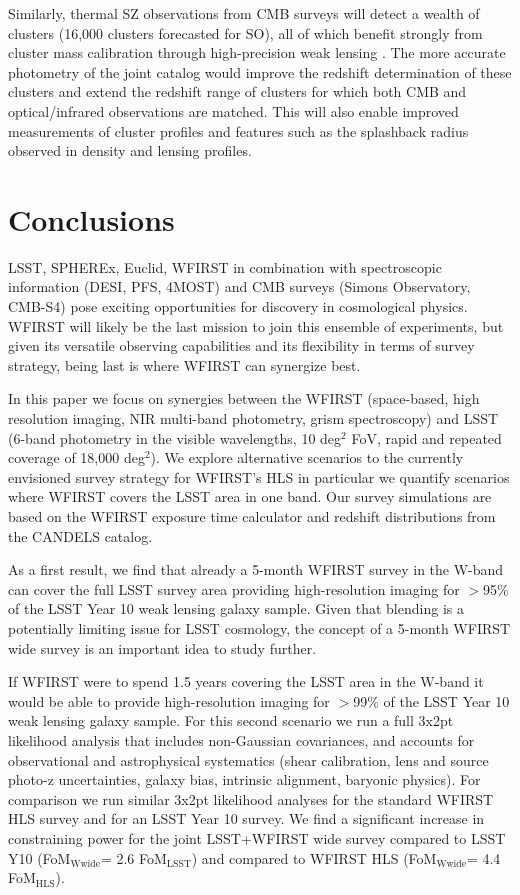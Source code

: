 \documentclass[fleqn,usenatbib,useAMS]{mnras}
\newcommand{\mr}{\mathrm}
\begin{document}
Similarly, thermal SZ observations from CMB surveys will detect a wealth of clusters (16,000 clusters forecasted for SO), all of which benefit strongly from cluster mass calibration through high-precision weak lensing \citep[see e.g.][for corresponding applications to the Atacama Cosmology Telescope and the South Pole Telescope]{mbh19,bds19}. The more accurate photometry of the joint catalog would improve the redshift determination of these clusters and extend the redshift range of clusters for which both CMB and optical/infrared observations are matched. This will also enable improved measurements of cluster profiles and features such as the splashback radius observed in density and lensing profiles. 

\section{Conclusions}
\label{sec:conc}
LSST, SPHEREx, Euclid, WFIRST in combination with spectroscopic information (DESI, PFS, 4MOST) and CMB surveys (Simons Observatory, CMB-S4) pose exciting opportunities for discovery in cosmological physics. WFIRST will likely be the last mission to join this ensemble of experiments, but given its versatile observing capabilities and its flexibility in terms of survey strategy, being last is where WFIRST can synergize best.

In this paper we focus on synergies between the WFIRST (space-based, high resolution imaging, NIR multi-band photometry, grism spectroscopy) and LSST (6-band photometry in the visible wavelengths, 10 deg$^2$ FoV, rapid and repeated coverage of 18,000 deg$^2$). We explore alternative scenarios to the currently envisioned survey strategy for WFIRST's HLS in particular we quantify scenarios where WFIRST covers the LSST area in one band. Our survey simulations are based on the WFIRST exposure time calculator and redshift distributions from the CANDELS catalog.

As a first result, we find that already a 5-month WFIRST survey in the W-band can cover the full LSST survey area providing high-resolution imaging for $>$95\% of the LSST Year 10 weak lensing galaxy sample. Given that blending is a potentially limiting issue for LSST cosmology, the concept of a 5-month WFIRST wide survey is an important idea to study further.

If WFIRST were to spend 1.5 years covering the LSST area in the W-band it would be able to provide high-resolution imaging for $>$99\% of the LSST Year 10 weak lensing galaxy sample. For this second scenario we run a full 3x2pt likelihood analysis that includes non-Gaussian covariances, and accounts for observational and astrophysical systematics (shear calibration, lens and source photo-z uncertainties, galaxy bias, intrinsic alignment, baryonic physics). For comparison we run similar 3x2pt likelihood analyses for the standard WFIRST HLS survey and for an LSST Year 10 survey.  We find a significant increase in constraining power for the joint LSST+WFIRST wide survey compared to LSST Y10 (FoM$_\mr{Wwide}$= 2.6 FoM$_\mr{LSST}$) and compared to WFIRST HLS (FoM$_\mr{Wwide}$= 4.4 FoM$_\mr{HLS}$). 
\end{document}

